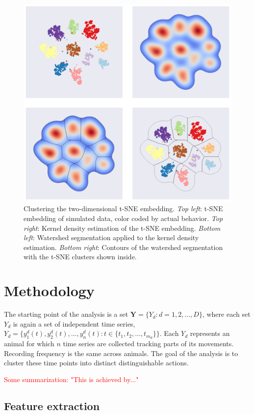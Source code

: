 \documentclass[a4paper]{memoir}
\theoremstyle{plain}
\theoremstyle{definition}
\theoremstyle{remark}
\begin{document}
\begin{figure}[tb]
        \centering
        \includegraphics[width=0.8\linewidth]{./code/figures/clustering_example.pdf}
        \caption{Clustering the two-dimensional t-SNE embedding. \textit{Top left}: t-SNE embedding of simulated data, color coded by actual behavior. 
        \textit{Top right}: Kernel density estimation of the t-SNE embedding.
\textit{Bottom left}: Watershed segmentation applied to the kernel density estimation.
\textit{Bottom right}: Contours of the watershed segmentation with the t-SNE clusters shown inside.}
        \label{fig:clustering_example}
\end{figure}





\chapter{Methodology}
The starting point of the analysis is a set $\textbf{Y} =  \{ Y_d : d = 1, 2, \hdots, D \}$, where each set $Y_d$ is again a set of independent time series, $Y_d = \{ y_1^d(t), y_2^d(t), \hdots, y_n^d(t): t \in \{t_1, t_2, \hdots, t_{m_d} \} \}$.
Each $Y_d$ represents an animal for which $n$ time series are collected tracking parts of its movements.
Recording frequency is the same across animals.
The goal of the analysis is to cluster these time points into distinct distinguishable actions.

\textcolor{red}{Some summarization: "This is achieved by..."}

\section{Feature extraction}
\end{document}
